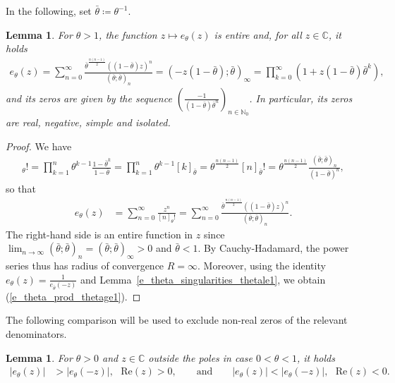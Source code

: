 \documentclass[12pt]{article}
\newcommand{\N}{\mathbb{N}} %
\newcommand{\C}{\mathbb{C}} %
\newcommand{\1}{\mathds{1}}
\renewcommand{\Re}{\mathrm{Re}}
\theoremstyle{definition}
\theoremstyle{plain}
\newtheorem{Lemma}[definition]{Lemma}
\theoremstyle{remark}
\begin{document}
In the following, set $\bar\theta\coloneqq\theta^{-1}$. 
\begin{Lemma}\label{e_theta_entire_thetage1}
    For $\theta>1$, the function $z\mapsto e_\theta(z)$ is entire and, for all $z\in\C$, it holds
    \begin{align}\label{e_theta_prod_thetage1}
        e_\theta(z)=\sum_{n=0}^\infty\frac{\bar\theta^{\frac{n(n-1)}{2}}((1-\bar\theta)z)^n}{(\bar\theta;\bar\theta)_n}=(-z(1-\bar\theta);\bar\theta)_\infty=\prod_{k=0}^\infty(1+z(1-\bar\theta)\bar\theta^k),
    \end{align}
    and its zeros are given by the sequence $\left(\frac{-1}{(1-\bar\theta)\bar\theta^n}\right)_{n\in\N_0}$.  In particular, its zeros are real, negative, simple and isolated.
\end{Lemma}
\begin{proof}
We have
\begin{align*}
    [n]_\theta!
    =\prod_{k=1}^n\theta^{k-1}\frac{1-\bar\theta^k}{1-\bar\theta}
    =\prod_{k=1}^n\theta^{k-1}[k]_{\bar\theta}
    =\theta^{\frac{n(n-1)}{2}}[n]_{\bar\theta}!
    =\theta^{\frac{n(n-1)}{2}}\frac{(\bar\theta;\bar\theta)_n}{(1-\bar\theta)^n},
\end{align*}
so that
\begin{align*}
    e_{\theta}(z)
        &= \sum_{n=0}^\infty \frac{z^{n}}{[n]_{\theta}!}
        =\sum_{n=0}^\infty\frac{\bar\theta^{\frac{n(n-1)}{2}}((1-\bar\theta)z)^n}{(\bar\theta;\bar\theta)_n}.
\end{align*}
The right-hand side is an entire function in $z$ since $\lim_{n\to\infty}(\bar\theta;\bar\theta)_n=(\bar\theta;\bar\theta)_\infty>0$ and $\bar\theta<1$.
By Cauchy-Hadamard, the power series thus has radius of convergence $R=\infty$. Moreover, using the identity $e_\theta(z)=\frac{1}{e_{\bar\theta}(-z)}$ and Lemma~\ref{e_theta_singularities_thetale1}, we obtain (\ref{e_theta_prod_thetage1}).
\end{proof}
The following comparison will be used to exclude non-real zeros of the relevant denominators.
\begin{Lemma}\label{estimate_e_theta_ge_1_prelim}
    For $\theta>0$ and $z\in\C$ outside the poles in case $0<\theta<1$, it holds
    \begin{align*}
        |e_\theta(z)|&>|e_\theta(-z)|,~~~\Re(z)>0,
        \qquad \text{and}\qquad
        |e_\theta(z)|<|e_\theta(-z)|,~~~\Re(z)<0.
    \end{align*}
\end{Lemma}
\end{document}
